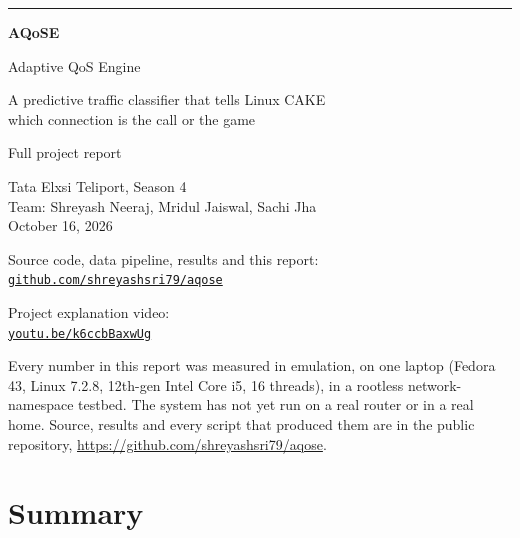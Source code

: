 \documentclass[11pt,a4paper]{article}
\begin{document}
\begin{titlepage}
\vspace*{2.2cm}
{\color{aq}\rule{\linewidth}{1.2pt}}\par\vspace{0.6cm}
{\fontsize{40}{44}\selectfont\bfseries\color{ink} AQoSE}\par\vspace{0.3cm}
{\LARGE\color{ink} Adaptive QoS Engine}\par\vspace{0.4cm}
{\large\color{muted} A predictive traffic classifier that tells Linux CAKE\\ which connection is the call or the game}\par
\vspace{0.6cm}{\color{aq}\rule{\linewidth}{1.2pt}}\par
\vspace{1.2cm}
{\large Full project report}\par\vspace{0.2cm}
{\color{muted} Tata Elxsi Teliport, Season 4\\ Team: Shreyash Neeraj, Mridul Jaiswal, Sachi Jha\\ October 16, 2026}\par\vspace{0.5cm}
{\small Source code, data pipeline, results and this report:\\ \href{https://github.com/shreyashsri79/aqose}{\texttt{github.com/shreyashsri79/aqose}}}\par\vspace{0.3cm}
{\small Project explanation video:\\ \href{https://youtu.be/k6ccbBaxwUg}{\texttt{youtu.be/k6ccbBaxwUg}}}
\vfill
\begin{minipage}{\linewidth}\small\color{muted}
Every number in this report was measured in emulation, on one laptop (Fedora 43, Linux 7.2.8, 12th-gen Intel Core i5, 16 threads), in a rootless network-namespace testbed. The system has not yet run on a real router or in a real home. Source, results and every script that produced them are in the public repository, \url{https://github.com/shreyashsri79/aqose}.
\end{minipage}
\end{titlepage}

\clearpage{}
\section*{Summary}
\end{document}
